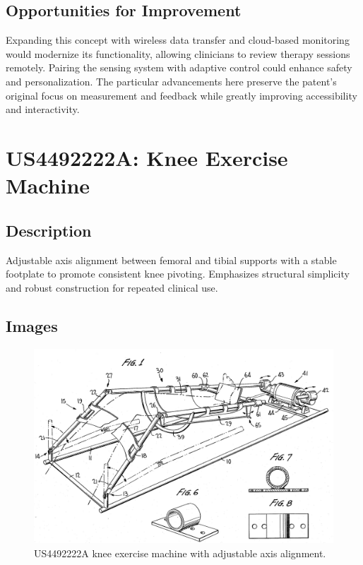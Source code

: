 \documentclass[11pt]{article}
\begin{document}
\subsection{Opportunities for Improvement}
Expanding this concept with wireless data transfer and cloud-based monitoring would modernize its functionality, allowing clinicians to review therapy sessions remotely. Pairing the sensing system with adaptive control could enhance safety and personalization. The particular advancements here preserve the patent's original focus on measurement and feedback while greatly improving accessibility and interactivity.

\section{US4492222A: Knee Exercise Machine}
\subsection{Description}
Adjustable axis alignment between femoral and tibial supports with a stable footplate to promote consistent knee pivoting. Emphasizes structural simplicity and robust construction for repeated clinical use.
\subsection{Images}
\begin{figure}[H]
  \centering
  \includegraphics[width=0.54\linewidth]{4492222A_1.png}
  \caption{US4492222A knee exercise machine with adjustable axis alignment.}
  \label{fig:US4492222A}
\end{figure}
\end{document}
